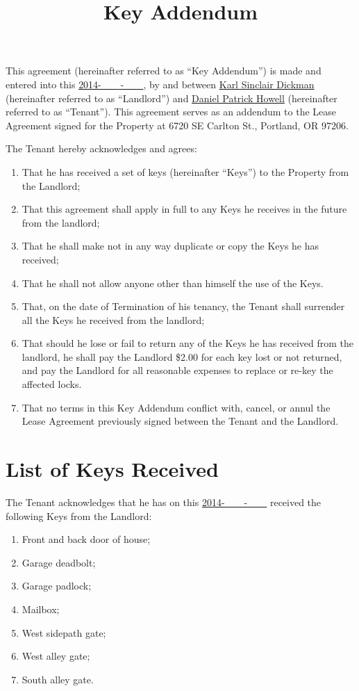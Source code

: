 \documentclass{amsart}
\title{Key Addendum}
\begin{document}
\maketitle
This agreement (hereinafter referred to as ``Key Addendum'') is made and entered
into this \underline{2014-\ \ \ \ -\ \ \ \ }, by and between \underline{Karl
Sinclair Dickman} (hereinafter referred to as ``Landlord'') and
\underline{Daniel Patrick Howell} (hereinafter referred to as ``Tenant''). This
agreement serves as an addendum to the Lease Agreement signed for the Property
at 6720 SE Carlton St., Portland, OR 97206.

The Tenant hereby acknowledges and agrees:
\begin{enumerate}
    \item That he has received a set of keys (hereinafter ``Keys'') to the Property
        from the Landlord;
    \item That this agreement shall apply in full to any Keys he receives in the
        future from the landlord;
    \item That he shall make not in any way duplicate or copy the Keys he has
        received;
    \item That he shall not allow anyone other than himself the use of the Keys.
    \item That, on the date of Termination of his tenancy, the Tenant shall
        surrender all the Keys he received from the landlord;
    \item That should he lose or fail to return any of the Keys he has received
        from the landlord, he shall pay the Landlord \$2.00 for each key lost or
        not returned, and pay the Landlord for all reasonable expenses to
        replace or re-key the affected locks.
    \item That no terms in this Key Addendum conflict with, cancel, or annul the
        Lease Agreement previously signed between the Tenant and the Landlord.
\end{enumerate}
\section*{List of Keys Received}
The Tenant acknowledges that he has on this \underline{2014-\ \ \ \ -\ \ \ \ }
received the following Keys from the Landlord:
\begin{enumerate}
    \item Front and back door of house;
    \item Garage deadbolt;
    \item Garage padlock;
    \item Mailbox;
    \item West sidepath gate;
    \item West alley gate;
    \item South alley gate.
\end{enumerate}
\newpage
\end{document}
